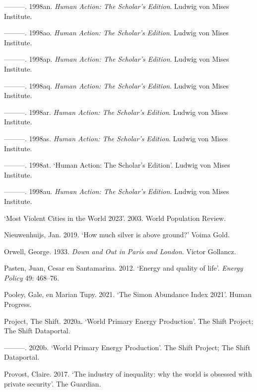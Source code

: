 \documentclass[
  a5paper,
  smalldemyvopaper,11pt,twoside,onecolumn,openright,extrafontsizes,
hidelinks]{memoir}
\newlength{\cslhangindent}
\newenvironment{CSLReferences}[2] %
 {\begin{list}{}{%
  \setlength{\itemindent}{0pt}
  \setlength{\leftmargin}{0pt}
  \setlength{\parsep}{0pt}
  \ifodd #1
   \setlength{\leftmargin}{\cslhangindent}
   \setlength{\itemindent}{-1\cslhangindent}
  \fi
  \setlength{\itemsep}{#2\baselineskip}}}
 {\end{list}}
\begin{document}
\begin{CSLReferences}{1}{0}
---------. 1998an. \emph{Human Action: The Scholar's Edition}. Ludwig
von Mises Institute.

---------. 1998ao. \emph{Human Action: The Scholar's Edition}. Ludwig
von Mises Institute.

---------. 1998ap. \emph{Human Action: The Scholar's Edition}. Ludwig
von Mises Institute.

---------. 1998aq. \emph{Human Action: The Scholar's Edition}. Ludwig
von Mises Institute.

---------. 1998ar. \emph{Human Action: The Scholar's Edition}. Ludwig
von Mises Institute.

---------. 1998as. \emph{Human Action: The Scholar's Edition}. Ludwig
von Mises Institute.

---------. 1998at. {`Human Action: The Scholar's Edition'}. Ludwig von
Mises Institute.

---------. 1998au. \emph{Human Action: The Scholar's Edition}. Ludwig
von Mises Institute.

{`Most Violent Cities in the World 2023'}. 2003. World Population
Review.

Nieuwenhuijs, Jan. 2019. {`How much silver is above ground?'} Voima
Gold.

Orwell, George. 1933. \emph{Down and Out in Paris and London}. Victor
Gollancz.

Pasten, Juan, Cesar en Santamarina. 2012. {`Energy and quality of
life'}. \emph{Energy Policy} 49: 468--76.

Pooley, Gale, en Marian Tupy. 2021. {`The Simon Abundance Index 2021'}.
Human Progress.

Project, The Shift. 2020a. {`World Primary Energy Production'}. The
Shift Project; The Shift Dataportal.

---------. 2020b. {`World Primary Energy Production'}. The Shift
Project; The Shift Dataportal.

Provost, Claire. 2017. {`The industry of inequality: why the world is
obsessed with private security'}. The Guardian.


\end{CSLReferences}
\end{document}
